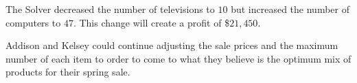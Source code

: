The Solver decreased the number of televisions to $ 10 $ but increased the number of computers to $ 47 $. This change will create a profit of \$$ 21,450 $.

Addison and Kelsey could continue adjusting the sale prices and the maximum number of each item to order to come to what they believe is the optimum mix of products for their spring sale.





